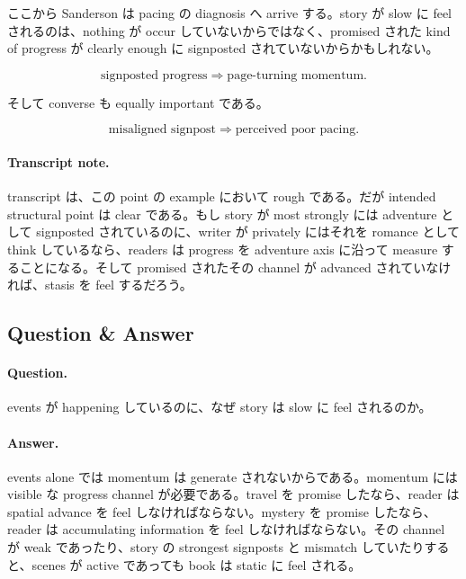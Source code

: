 ここから Sanderson は pacing の diagnosis へ arrive する。story が slow に feel されるのは、nothing が occur していないからではなく、promised された kind of progress が clearly enough に signposted されていないからかもしれない。

\begin{equation}
\text{signposted progress} \Rightarrow \text{page-turning momentum}.
\end{equation}

そして converse も equally important である。

\begin{equation}
\text{misaligned signpost} \Rightarrow \text{perceived poor pacing}.
\end{equation}

\paragraph{Transcript note.} transcript は、この point の example において rough である。だが intended structural point は clear である。もし story が most strongly には adventure として signposted されているのに、writer が privately にはそれを romance として think しているなら、readers は progress を adventure axis に沿って measure することになる。そして promised されたその channel が advanced されていなければ、stasis を feel するだろう。

\subsection{Question \& Answer}

\paragraph{Question.} events が happening しているのに、なぜ story は slow に feel されるのか。

\paragraph{Answer.} events alone では momentum は generate されないからである。momentum には visible な progress channel が必要である。travel を promise したなら、reader は spatial advance を feel しなければならない。mystery を promise したなら、reader は accumulating information を feel しなければならない。その channel が weak であったり、story の strongest signposts と mismatch していたりすると、scenes が active であっても book は static に feel される。

